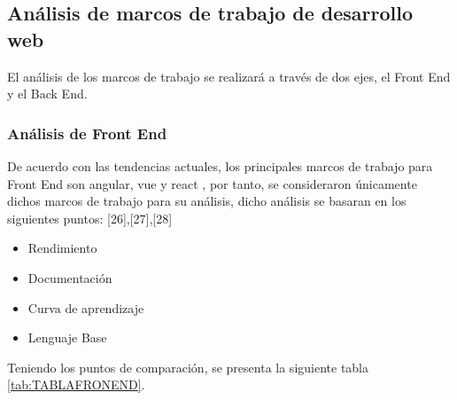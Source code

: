\subsection{Análisis de marcos de trabajo de desarrollo web}

El análisis de los marcos de trabajo se realizará a través de dos ejes, el Front End y el Back End.
\subsubsection{Análisis de Front End}
De acuerdo con las tendencias actuales, los principales marcos de trabajo para Front End son  angular, vue y  react , por tanto, se consideraron únicamente dichos marcos de trabajo para su análisis, dicho análisis se basaran en los siguientes puntos: [26],[27],[28]
\begin{itemize}
	\item Rendimiento
	\item Documentación
	\item Curva de aprendizaje
	\item Lenguaje Base
\end{itemize}
Teniendo los puntos de comparación, se presenta la siguiente tabla \ref{tab:TABLAFRONEND}. 
